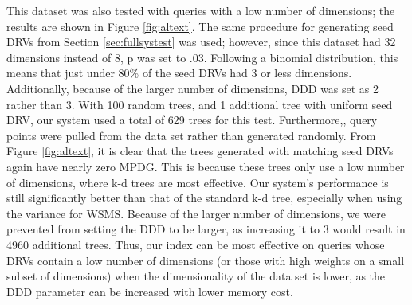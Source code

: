 This dataset was also tested with queries with a low number of dimensions; the results are shown in Figure \ref{fig:altext}.  The same procedure for generating seed DRVs from Section \ref{sec:fullsystest} was used; however, since this dataset had 32 dimensions instead of 8, p was set to .03.  Following a binomial distribution, this means that just under 80\% of the seed DRVs had 3 or less dimensions.  Additionally, because of the larger number of dimensions, DDD was set as 2 rather than 3.  With 100 random trees, and 1 additional tree with uniform seed DRV, our system used a total of 629 trees for this test.  Furthermore,, query points were pulled from the data set rather than generated randomly.  From Figure \ref{fig:altext}, it is clear that the trees generated with matching seed DRVs again have nearly zero MPDG.  This is because these trees only use a low number of dimensions, where k-d trees are most effective.  Our system's performance is still significantly better than that of the standard k-d tree, especially when using the variance for WSMS.  Because of the larger number of dimensions, we were prevented from setting the DDD to be larger, as increasing it to 3 would result in 4960 additional trees.  Thus, our index can be most effective on queries whose DRVs contain a low number of dimensions (or those with high weights on a small subset of dimensions) when the dimensionality of the data set is lower, as the DDD parameter can be increased with lower memory cost.